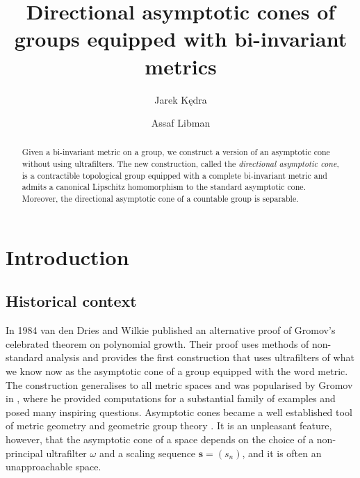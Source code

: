 \documentclass[12pt]{amsart}
\title[Asymptotic cones]{Directional asymptotic cones of groups equipped with bi-invariant metrics}
\author{Jarek K\k{e}dra}
\author{Assaf Libman}
\theoremstyle{definition}
\newcommand{\B}[1]{\mathbf{#1}}
\begin{document}
\maketitle

\begin{abstract}
Given a bi-invariant metric on a group, we construct a version of an asymptotic
cone without using ultrafilters.  The new construction, called the {\it
directional asymptotic cone}, is a contractible topological group equipped with
a complete bi-invariant metric and admits a canonical Lipschitz homomorphism to
the standard asymptotic cone. Moreover, the directional asymptotic cone of a
countable group is separable.
\end{abstract}


\setcounter{tocdepth}{1}
\tableofcontents




%

\section{Introduction}

\subsection{Historical context}
In 1984 van den Dries and Wilkie \cite{MR751150} published an alternative proof
of Gromov's celebrated theorem on polynomial growth. Their proof uses methods
of non-standard analysis and provides the first construction that uses
ultrafilters of what we know now as the asymptotic cone of a group equipped
with the word metric. The construction generalises to all metric spaces and was
popularised by Gromov in \cite{MR1253544}, where he provided computations for a
substantial family of examples and posed many inspiring questions.  Asymptotic
cones became a well established tool of metric geometry and geometric group
theory \cite{MR3753580}. It is an unpleasant feature, however, that the asymptotic cone of a
space depends on the choice of a non-principal ultrafilter $\omega$ and a scaling sequence $\B s=(s_n)$, and it is often an unapproachable space.
\end{document}
